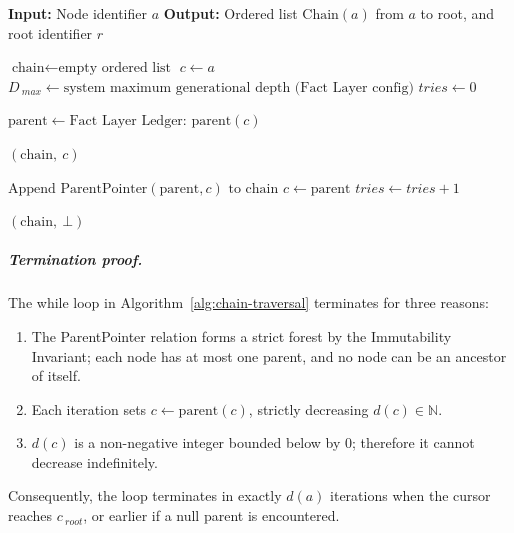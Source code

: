 \begin{algorithm}[htbp]
\caption{Chain Traversal: Locate Accountability Root for Node $a$}
\label{alg:chain-traversal}
\begin{algorithmic}
\Statex \textbf{Input:} Node identifier $a$
\Statex \textbf{Output:} Ordered list $\text{Chain}(a)$ from $a$ to root, and root identifier $r$

  \State $\text{chain} \gets \text{empty ordered list}$
  \State $c \gets a$
  \State $D_{\ max} \gets \text{system maximum generational depth (Fact Layer config)}$
  \State $tries \gets 0$

    \State $\text{parent} \gets \text{Fact Layer Ledger: parent}(c)$ 
    \Statex {}
    \State

      \State \Return $(\text{chain},\ c)$
    \EndIf
    \State

    \State $\text{Append } \text{ParentPointer}(\text{parent}, c) \text{ to } \text{chain}$
    \State $c \gets \text{parent}$
    \State $tries \gets tries + 1$
  \EndWhile

  \Statex {}
  \Statex {}
  \Statex {}
  \Statex {}

    \State {}
    \State {}
    \State \Return $(\text{chain},\ \bot)$ 
  \EndIf
\EndFunction
\end{algorithmic}
\end{algorithm}

\subparagraph{Termination proof.}
The while loop in Algorithm~\ref{alg:chain-traversal} terminates for three reasons:
\begin{enumerate}
\item The ParentPointer relation forms a strict forest by the Immutability Invariant; each node has at most one parent, and no node can be an ancestor of itself.
\item Each iteration sets $c \gets \text{parent}(c)$, strictly decreasing $d(c) \in \mathbb{N}$.
\item $d(c)$ is a non-negative integer bounded below by $0$; therefore it cannot decrease indefinitely.
\end{enumerate}
Consequently, the loop terminates in exactly $d(a)$ iterations when the cursor reaches $c_{\ root}$, or earlier if a null parent is encountered.

